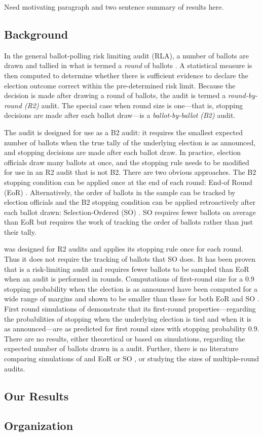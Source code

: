 Need motivating paragraph and two sentence summary of results here. 

\subsection{Background}
In the general ballot-polling risk limiting audit (RLA), a number of ballots are drawn and tallied in what is termed a {\em round} of ballots \cite{usenix_minerva}. A statistical measure is then computed to determine whether there is sufficient evidence to declare the election outcome correct within the pre-determined risk limit. Because the decision is made after drawing a round of ballots, the audit is termed a {\em round-by-round (R2)} audit. The special case when round size is one---that is, stopping decisions are made after each ballot draw---is a {\em ballot-by-ballot (B2)} audit. 

The \BRAVO audit is designed for use as a B2 audit: it requires the smallest expected number of ballots when the true tally of the underlying election is as announced, and stopping decisions are made after each ballot draw. In practice, election officials draw many ballots at once, and the \BRAVO stopping rule needs to be modified for use in an R2 audit that is not B2. There are two obvious approaches. The B2 stopping condition can be applied once at the end of each round: End-of Round (EoR) \BRAVO.  Alternatively, the order of ballots in the sample can be tracked by election officials and the B2 \BRAVO stopping condition can be applied retroactively after each ballot drawn: Selection-Ordered (SO) \BRAVO. SO \BRAVO requires fewer ballots on average than EoR \BRAVO but requires the work of tracking the order of ballots rather than just their tally.

\Minerva was designed for R2 audits and applies its stopping rule once for each round. Thus it does not require the tracking of ballots that SO \BRAVO does. It has been proven that \Minerva is a risk-limiting audit and requires fewer ballots to be sampled than EoR \BRAVO when an audit is performed in rounds. Computations of first-round size for a 0.9 stopping probability when the election is as announced have been computed for a wide range of margins and shown to be smaller than those for both EoR and SO \BRAVO. First round simulations of \Minerva \cite{arxiv_athena} demonstrate that its first-round properties---regarding the probabilities of stopping when the underlying election is tied and when it is as announced---are as predicted for first round sizes with stopping probability 0.9. There are no results, either theoretical or based on simulations, regarding the expected number of ballots drawn in a \Minerva audit. Further, there is no literature comparing simulations of \Minerva and EoR or SO \BRAVO, or studying the sizes of multiple-round \Minerva audits. 

\subsection{Our Results}

\subsection{Organization}

